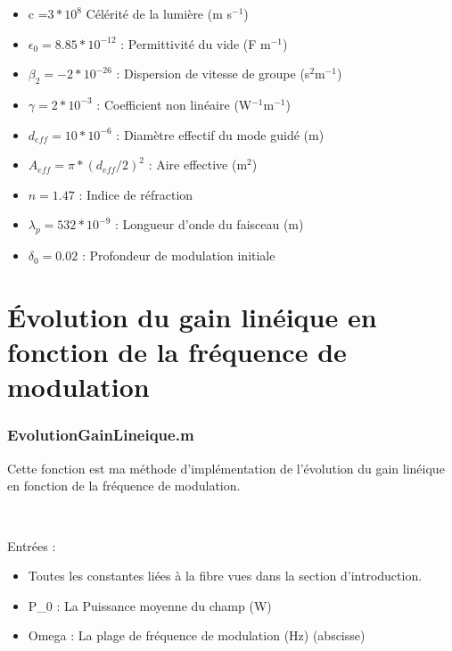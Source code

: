 \documentclass[a4paper,12pt,titlepage]{article}
\begin{document}
        \begin{itemize}
            \item c =$ 3*10^8 $                    Célérité de la lumière (m s$^{-1}$)
            \item $\epsilon_0 = 8.85 * 10^{-12}$ :   Permittivité du vide (F m$^{-1}$)
            \item $\beta_2 = -2 * 10^{-26}$ :       Dispersion de vitesse de groupe (s$^2$m$^{-1}$)
            \item $\gamma = 2*10^{-3}$ :            Coefficient non linéaire (W$^{-1}$m$^{-1}$)
            \item $d_{eff} = 10*10^{-6}$ :           Diamètre effectif du mode guidé (m)
            \item $A_{eff} = \pi*(d_{eff}/2)^2$ :       Aire effective (m$^2$)
            \item $n = 1.47$ :                     Indice de réfraction
            \item $\lambda_p = 532 * 10^{-9}$ :    Longueur d'onde du faisceau (m)
            \item $\delta_0 = 0.02$ :              Profondeur de modulation initiale
        \end{itemize}
        
    \newpage
    
    \section{Évolution du gain linéique en fonction de la fréquence de modulation}
    
        
        \subsubsection*{EvolutionGainLineique.m}
             Cette fonction est ma méthode d'implémentation de l'évolution du gain linéique en fonction de la fréquence de modulation.
             
             ~
             
             Entrées :
             \begin{itemize}
                 \item Toutes les constantes liées à la fibre vues dans la section d'introduction.
                 \item P\_0 : La Puissance moyenne du champ (W)
                 \item Omega : La plage de fréquence de modulation (Hz) (abscisse)
                 
             \end{itemize}
             
\end{document}
